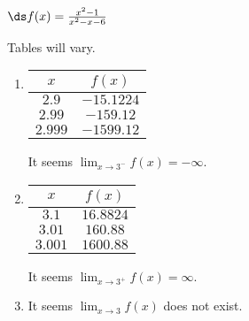 {$\ds f(x)=\frac{x^2-1}{x^2-x-6}$
}
{Tables will vary.
\begin{enumerate}
\item	
\begin{tabular}{cc}
$x$ & $f(x)$ \\ \hline
$2.9$ & $-15.1224$ \\
 $2.99$ & $-159.12$ \\
 $2.999$ & $-1599.12$
 \end{tabular}
 It seems $\lim_{x\to3^-}f(x) =-\infty$.
\item
\begin{tabular}{cc}
$x$ & $f(x)$ \\ \hline
$ 3.1$ & $16.8824$ \\
 $3.01$ & $160.88$ \\
 $3.001$ & $1600.88$
 \end{tabular}
  It seems $\lim_{x\to3^+}f(x) =\infty$.
  \item		It seems $\lim_{x\to3}f(x)$ does not exist.
\end{enumerate}
}
